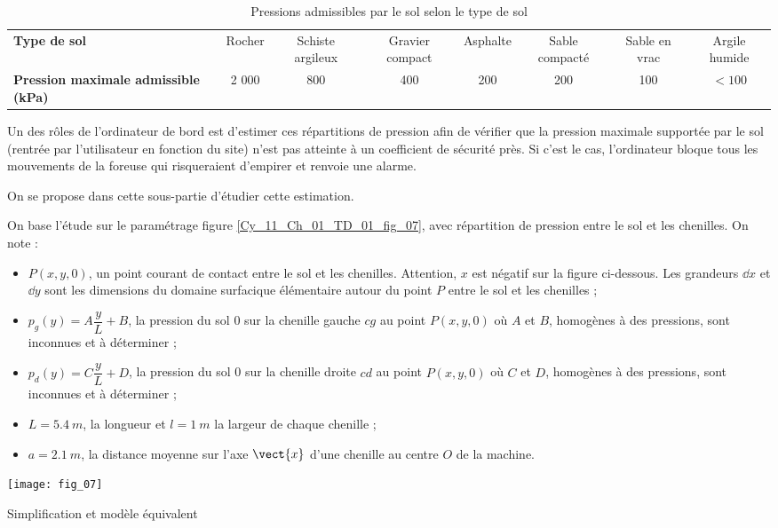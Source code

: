 \begin{table*}
\footnotesize{
\begin{tabular}{p{3cm}ccccccc}
\hline
\textbf{Type de sol} & Rocher & Schiste argileux & Gravier compact & Asphalte & Sable compacté & Sable en 
vrac & Argile humide \\
\textbf{Pression 
maximale 
admissible (kPa)} & 2 000 & 800 & 400&  200&  200&  100 & $<100$ \\ \hline
\end{tabular}}
\caption{Pressions admissibles par le sol selon le type de sol \label{Cy_11_Ch_01_TD_01_tab_01}}
\end{table*}


Un des rôles de l’ordinateur de bord est d’estimer ces répartitions de pression afin de vérifier que la pression maximale supportée par le sol (rentrée par l’utilisateur en fonction du site) n’est pas atteinte à un coefficient de sécurité près. Si c’est le cas, l’ordinateur bloque tous les mouvements de la foreuse qui risqueraient d’empirer et renvoie une alarme. 

On se propose dans cette sous-partie d’étudier cette estimation. 
 
On base l’étude sur le paramétrage figure \ref{Cy_11_Ch_01_TD_01_fig_07}, avec répartition de pression entre le sol et les chenilles. On note : 
\begin{itemize}
\item $P(x,y,0)$, un point courant de contact entre le sol et les chenilles. Attention, $x$ est négatif sur la 
figure ci-dessous. Les grandeurs $\dd x$ et $\dd y$ sont les dimensions du domaine surfacique élémentaire autour du point $P$ entre le sol et les chenilles ; 
\item $p_g(y)= A \dfrac{y}{L}+B$, la pression du sol 0 sur la chenille gauche $cg$ au point $P(x,y,0)$ où $A$ et $B$, homogènes à des pressions, sont inconnues et à déterminer ; 
\item $p_d(y)= C \dfrac{y}{L}+D$, la pression du sol 0 sur la chenille droite $cd$ au point $P(x,y,0)$ où $C$ et $D$, 
homogènes à des pressions, sont inconnues et à déterminer ; 
\item $L = \SI{5,4}{m}$, la longueur et $l = \SI{1}{m}$ la largeur de chaque chenille ; 
\item $a = \SI{2,1}{m}$, la distance moyenne sur l’axe $\vect{x}$ d’une chenille au centre $O$ de la machine. 
\end{itemize}

\begin{marginfigure}
\centering
\texttt{[image: fig\_07]}
\caption{Simplification et modèle équivalent  \label{Cy_11_Ch_01_TD_01_fig_07}}
\end{marginfigure}


